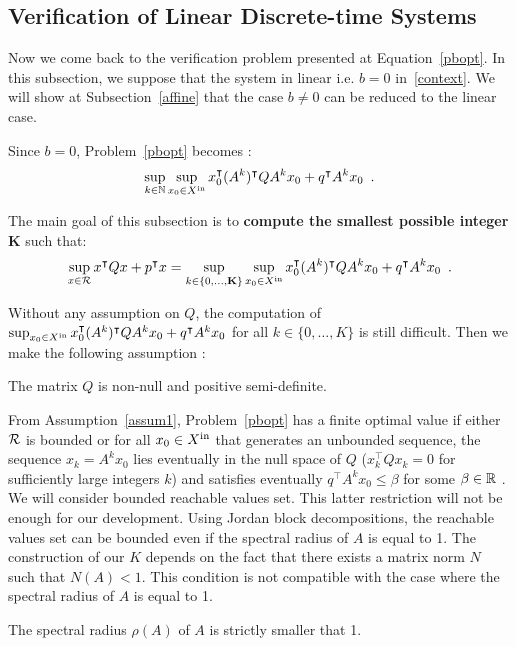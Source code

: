 \documentclass[10pt]{llncs}
\begin{document}
\subsection{Verification of Linear Discrete-time Systems}
\label{mainsub}
Now we come back to the verification problem presented at Equation~\eqref{pbopt}. In this subsection, we suppose that the system in linear i.e. $b=0$ in~\eqref{context}. We will show at Subsection~\ref{affine} that the case $b\neq 0$ can be reduced to the linear case.

Since $b=0$, Problem~\eqref{pbopt} becomes :
\begin{equation}
\label{pblinear}
\sup_{k\in\mathbb{N}}\sup_{x_0\in X^\mathrm{in}} x_0^\intercal (A^k)^\intercal Q A^k x_0+q^\intercal A^k x_0\enspace .
\end{equation}

The main goal of this subsection is to {\bf compute the smallest possible integer} $\mathbf K$ such that:
\[
 \sup_{x\in\mathcal{R}} x^\intercal Q x+p^\intercal x=\sup_{k\in\{0,\ldots,\mathbf K\}}\sup_{x_0\in X^\mathrm{in}} x_0^\intercal (A^k)^\intercal Q A^k x_0+q^\intercal A^k x_0\enspace .
\]

Without any assumption on $Q$, the computation of  $\sup_{x_0\in X^\mathrm{in}} x_0^\intercal (A^k)^\intercal Q A^k x_0+q^\intercal A^k x_0$ for all $k\in\{0,\ldots,K\}$ is still difficult. Then we make the following assumption : 
\begin{assumption}
\label{assum1}
The matrix $Q$ is non-null and positive semi-definite.
\end{assumption}

From Assumption~\ref{assum1}, Problem~\eqref{pbopt} has a finite optimal value if either $\mathcal{R}$ is bounded or for all 
$x_0\in X^\mathrm{in}$ that generates an unbounded sequence, the sequence $x_k=A^k x_0$ lies eventually in the null space of $Q$ ($x_k^\intercal Q x_k=0$ for sufficiently large integers $k$) and satisfies eventually $q^\intercal A^k x_0\leq \beta$ for some $\beta\in\mathbb R$ .  We will consider bounded reachable values set. This latter restriction will not be enough for our development. Using Jordan block decompositions, the reachable values set can be bounded even if the spectral radius of $A$ is equal to 1. The construction of our $K$ depends on the fact that there exists a matrix norm $N$ such that $N(A)<1$. This condition is not compatible with the case where the spectral radius of $A$ is equal to 1.

\begin{assumption}
\label{assum2}
The spectral radius $\rho(A)$ of $A$ is strictly smaller that 1.
\end{assumption}
\end{document}
